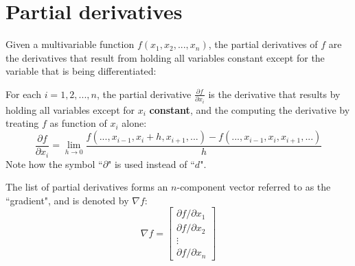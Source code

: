 \documentclass{article}
\begin{document}
\begin{itemize}
\end{itemize}




\section*{Partial derivatives}

Given a multivariable function \(f(x_1, x_2, ..., x_n)\), the partial derivatives of \(f\) are the derivatives that result from holding all variables constant except for the variable that is being differentiated:

For each \(i = 1, 2, ..., n\), the partial derivative \(\frac{\partial f}{\partial x_i}\) is the derivative that results by holding all variables except for \(x_i\) {\bf constant}, and the computing the derivative by treating \(f\) as function of \(x_i\) alone:
\[\frac{\partial f}{\partial x_i} = \lim_{h \rightarrow 0} \frac{f(..., x_{i-1}, x_i + h, x_{i+1}, ...) - f(..., x_{i-1}, x_i, x_{i+1}, ...)}{h}\] 
Note how the symbol ``\(\partial\)" is used instead of ``\(d\)".

The list of partial derivatives forms an \(n\)-component vector referred to as the ``gradient", and is denoted by \(\nabla f\): 
\[\nabla f = \begin{bmatrix} \partial f / \partial x_1 \\ \partial f / \partial x_2 \\ \vdots \\ \partial f / \partial x_n \end{bmatrix}\]
\end{document}
